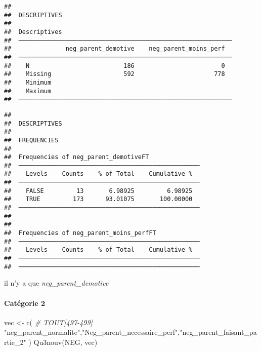 \documentclass[
]{article}
\newenvironment{Shaded}{\begin{snugshade}}{\end{snugshade}}
\newcommand{\CommentTok}[1]{\textcolor[rgb]{0.56,0.35,0.01}{\textit{#1}}}
\newcommand{\FunctionTok}[1]{\textcolor[rgb]{0.00,0.00,0.00}{#1}}
\newcommand{\NormalTok}[1]{#1}
\newcommand{\OtherTok}[1]{\textcolor[rgb]{0.56,0.35,0.01}{#1}}
\newcommand{\StringTok}[1]{\textcolor[rgb]{0.31,0.60,0.02}{#1}}
\begin{document}
\begin{verbatim}
## 
##  DESCRIPTIVES
## 
##  Descriptives                                                
##  ─────────────────────────────────────────────────────────── 
##               neg_parent_demotive    neg_parent_moins_perf   
##  ─────────────────────────────────────────────────────────── 
##    N                          186                        0   
##    Missing                    592                      778   
##    Minimum                                                   
##    Maximum                                                   
##  ───────────────────────────────────────────────────────────
\end{verbatim}

\begin{verbatim}
## 
##  DESCRIPTIVES
## 
##  FREQUENCIES
## 
##  Frequencies of neg_parent_demotiveFT               
##  ────────────────────────────────────────────────── 
##    Levels    Counts    % of Total    Cumulative %   
##  ────────────────────────────────────────────────── 
##    FALSE         13       6.98925         6.98925   
##    TRUE         173      93.01075       100.00000   
##  ────────────────────────────────────────────────── 
## 
## 
##  Frequencies of neg_parent_moins_perfFT             
##  ────────────────────────────────────────────────── 
##    Levels    Counts    % of Total    Cumulative %   
##  ────────────────────────────────────────────────── 
##  ──────────────────────────────────────────────────
\end{verbatim}

il n'y a que \emph{neg\_parent\_demotive}

\hypertarget{catuxe9gorie-2-6}{%
\paragraph{Catégorie 2}\label{catuxe9gorie-2-6}}

\begin{Shaded}
\begin{Highlighting}[]
\NormalTok{vec }\OtherTok{\textless{}{-}} \FunctionTok{c}\NormalTok{(   }\CommentTok{\# TOUT[497{-}499]}
  \StringTok{"neg\_parent\_normalite"}\NormalTok{,}\StringTok{"Neg\_parent\_necessaire\_perf"}\NormalTok{,}\StringTok{"neg\_parent\_faisant\_partie\_2"}  
\NormalTok{)}
\FunctionTok{Qu3nouv}\NormalTok{(NEG, vec)}
\end{Highlighting}
\end{Shaded}
\end{document}
